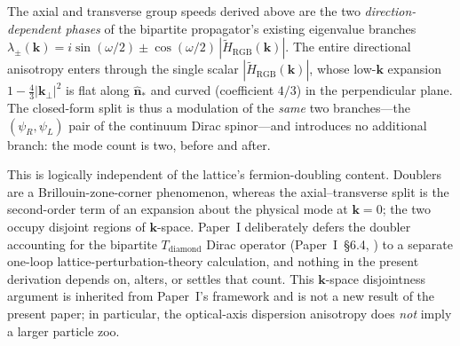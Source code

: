 \begin{remark}
\label{rem:no_new_modes}
The axial and transverse group speeds derived above are the two
\emph{direction-dependent phases} of the bipartite propagator's existing
eigenvalue branches $\lambda_\pm(\mathbf{k})
= i\sin(\omega/2) \pm \cos(\omega/2)\,|\tilde{H}_\text{RGB}(\mathbf{k})|$.
The entire directional anisotropy enters through the single scalar
$|\tilde{H}_\text{RGB}(\mathbf{k})|$, whose low-$\mathbf{k}$ expansion
$1 - \tfrac43|\mathbf{k}_\perp|^2$ is flat along $\hat{\mathbf{n}}_*$ and
curved (coefficient $4/3$) in the perpendicular plane.  The closed-form
split is thus a modulation of the \emph{same} two branches---the
$(\psi_R,\psi_L)$ pair of the continuum Dirac spinor---and introduces no
additional branch: the mode count is two, before and after.

This is logically independent of the lattice's fermion-doubling content.
Doublers are a Brillouin-zone-corner phenomenon, whereas the
axial--transverse split is the second-order term of an expansion
about the physical mode at $\mathbf{k}=0$; the two occupy disjoint regions
of $\mathbf{k}$-space.  Paper~I deliberately defers the doubler accounting
for the bipartite $T_\text{diamond}$ Dirac operator (Paper~I~\S6.4,
\cite{menendez2026geometryfirst}) to a separate one-loop
lattice-perturbation-theory calculation,
and nothing in the present derivation depends on, alters, or settles that
count.  This $\mathbf{k}$-space disjointness argument is inherited from
Paper~I's framework and is not a new result of the present paper; in
particular, the optical-axis dispersion anisotropy does \emph{not} imply a larger
particle zoo.
\end{remark}

